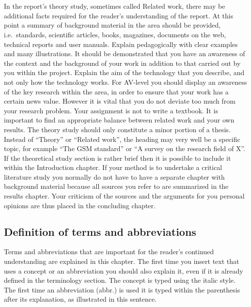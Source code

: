 \section{}\label{sec:theory} 
In the report's theory study, sometimes called Related work, there may be
additional facts required for the reader's understanding of the report. At this
point a summary of background material in the area should be provided, i.e.\
standards, scientific articles, books, magazines, documents on the web,
technical reports and user manuals. Explain pedagogically with clear examples
and many illustrations.  It should be demonstrated that you have an awareness of
the context and the background of your work in addition to that carried out by
you within the project. Explain the aim of the technology that you describe, and
not only how the technology works. For AV-level you should display an awareness
of the key research within the area, in order to ensure that your work has a
certain news value. However it is vital that you do not deviate too much from
your research problem.  Your assignment is not to write a textbook. It is
important to find an appropriate balance between related work and your own
results. The theory study should only constitute a minor portion of a thesis.
Instead of ``Theory'' or ``Related work'', the heading may very well be a specific
topic, for example ``The GSM standard'' or ``A survey on the research field of
X''.
If the theoretical study section is rather brief then it is possible to include
it within the Introduction chapter.  If your method is to undertake a critical
literature study you normally do not have to have a separate chapter with
background material because all sources you refer to are summarized in the
results chapter. Your criticism of the sources and the arguments for you
personal opinions are thus placed in the concluding chapter.

\subsection{Definition of terms and abbreviations}\label{subsec:definitionoftermsandabbreviations}
Terms and abbreviations that are important for the reader's continued
understanding are explained in this chapter. The first time you insert text that
uses a concept or an abbreviation you should also explain it, even if it is
already defined in the terminology section. The concept is typed using the
italic style.  The first time an abbreviation (abbr.) is used it is typed within
the parenthesis after its explanation, as illustrated in this sentence.
